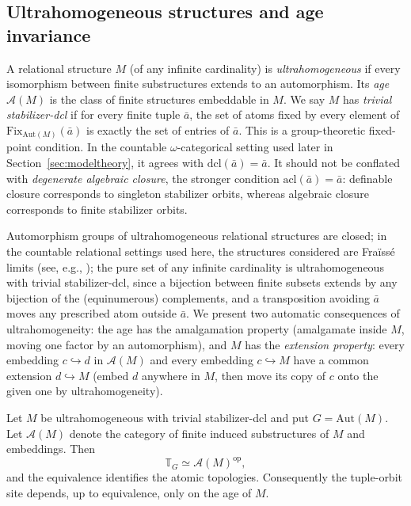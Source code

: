 \documentclass{lmcs}
\newcommand{\Fix}{\mathrm{Fix}}
\newcommand{\Aut}{\mathrm{Aut}}
\begin{document}
\subsection{Ultrahomogeneous structures and age invariance}

\begin{defi}\label{def:generic}
A relational structure $M$ (of any infinite cardinality) is
\emph{ultrahomogeneous} if every isomorphism between finite
substructures extends to an automorphism. Its \emph{age}
$\mathcal A(M)$ is the class of finite structures embeddable in $M$.
We say $M$ has \emph{trivial stabilizer-dcl} if for every finite tuple
$\bar a$, the set of atoms fixed by every element of
$\Fix_{\Aut(M)}(\bar a)$ is exactly the set of entries of $\bar a$.
This is a group-theoretic fixed-point condition. In the countable
$\omega$-categorical setting used later in Section~\ref{sec:modeltheory},
it agrees with $\mathrm{dcl}(\bar a)=\bar a$. It should not be
conflated with \emph{degenerate algebraic closure}, the stronger condition
$\mathrm{acl}(\bar a)=\bar a$: definable closure corresponds to
singleton stabilizer orbits, whereas algebraic closure corresponds to
finite stabilizer orbits.
\end{defi}

Automorphism groups of ultrahomogeneous relational structures are closed; in the
countable relational settings used here, the structures considered are
Fra\"iss\'e limits (see, e.g.,
\cite{Macpherson11}); the pure set of any
infinite cardinality is ultrahomogeneous with trivial stabilizer-dcl, since a
bijection between finite subsets extends by any bijection of the
(equinumerous) complements, and a transposition avoiding $\bar a$
moves any prescribed atom outside $\bar a$. We present two automatic
consequences of ultrahomogeneity: the age has the amalgamation property
(amalgamate inside $M$, moving one factor by an automorphism), and $M$
has the \emph{extension property}: every embedding $c\hookrightarrow
d$ in $\mathcal A(M)$ and every embedding $c\hookrightarrow M$ have a
common extension $d\hookrightarrow M$ (embed $d$ anywhere in $M$, then
move its copy of $c$ onto the given one by ultrahomogeneity).

\begin{lem}\label{lem:sitecomp}
Let $M$ be ultrahomogeneous with trivial stabilizer-dcl and put $G=\Aut(M)$.
Let $\mathcal A(M)$ denote the category of finite induced
substructures of $M$ and embeddings. Then
\[
   \mathbb T_G\simeq\mathcal A(M)^{\mathrm{op}},
\]
and the equivalence identifies the atomic topologies. Consequently
the tuple-orbit site depends, up to equivalence, only on the age of
$M$.
\end{lem}
\end{document}
